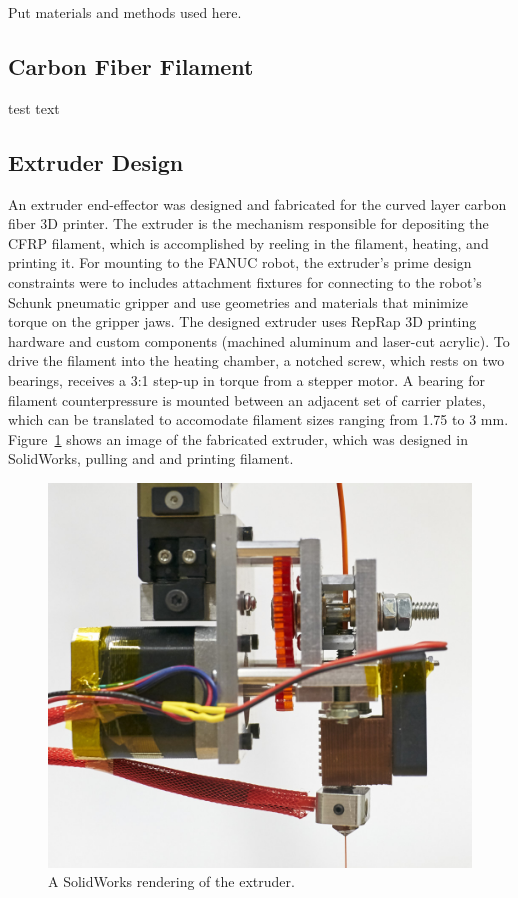 

Put materials and methods used here.

\subsection*{Carbon Fiber Filament}

test text\\

\subsection*{Extruder Design}

An extruder end-effector was designed and fabricated for the curved layer carbon fiber 3D printer. The extruder is the mechanism responsible for depositing the CFRP filament, which is accomplished by reeling in the filament, heating, and printing it. For mounting to the FANUC robot, the extruder's prime design constraints were to includes attachment fixtures for connecting to the robot's Schunk pneumatic gripper and use geometries and materials that minimize torque on the gripper jaws. The designed extruder uses RepRap 3D printing hardware and custom components (machined aluminum and laser-cut acrylic). To drive the filament into the heating chamber, a notched screw, which rests on two bearings, receives a 3:1 step-up in torque from a stepper motor. A bearing for filament counterpressure is mounted between an adjacent set of carrier plates, which can be translated to accomodate filament sizes ranging from 1.75 to 3 mm. Figure~\ref{fig:extruder-side-profile} shows an image of the fabricated extruder, which was designed in SolidWorks, pulling and and printing filament.


\begin{figure}[htp]
\centering
\includegraphics[width=0.8\linewidth]{./figures/extruder-side-profile}
\caption{A SolidWorks rendering of the extruder.}
\label{fig:extruder-side-profile}
\end{figure}


